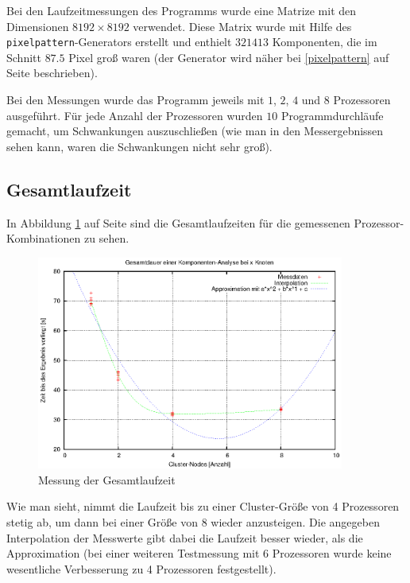 Bei den Laufzeitmessungen des Programms wurde eine Matrize mit den Dimensionen $8192 \times 8192$ verwendet. Diese Matrix wurde mit Hilfe des \texttt{pixelpattern}-Generators erstellt und enthielt $321413$ Komponenten, die im Schnitt $87.5$ Pixel groß waren (der Generator wird näher bei \ref{pixelpattern} auf Seite \pageref{pixelpattern} beschrieben).

Bei den Messungen wurde das Programm jeweils mit $1$, $2$, $4$ und $8$ Prozessoren ausgeführt. Für jede Anzahl der Prozessoren wurden $10$ Programmdurchläufe gemacht, um Schwankungen auszuschließen (wie man in den Messergebnissen sehen kann, waren die Schwankungen nicht sehr groß).

\subsection{Gesamtlaufzeit} \label{bench:whole}

In Abbildung \ref{fig:bench_whole} auf Seite \pageref{fig:bench_whole} sind die Gesamtlaufzeiten für die gemessenen Prozessor-Kombinationen zu sehen.

\begin{figure}[tbhp]
	\centering
	\includegraphics[width=0.9\textwidth]{images/whole_plod.eps}
	\caption{Messung der Gesamtlaufzeit}
	\label{fig:bench_whole}
\end{figure}

Wie man sieht, nimmt die Laufzeit bis zu einer Cluster-Größe von 4 Prozessoren stetig ab, um dann bei einer Größe von 8 wieder anzusteigen. Die angegeben Interpolation der Messwerte gibt dabei die Laufzeit besser wieder, als die Approximation (bei einer weiteren Testmessung mit 6 Prozessoren wurde keine wesentliche Verbesserung zu 4 Prozessoren festgestellt).

